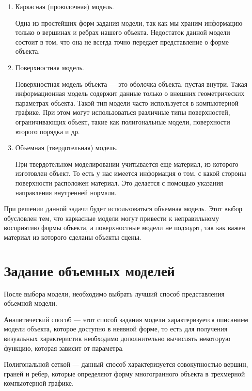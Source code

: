 \begin{enumerate}
	\item Каркасная (проволочная) модель.
	
	Одна из простейших форм задания модели, так как мы храним информацию только о вершинах и ребрах нашего объекта. Недостаток данной модели состоит в том, что она не всегда точно передает представление о форме объекта.
	
	\item Поверхностная модель.
	
	Поверхностная модель объекта --- это оболочка объекта, пустая внутри. Такая информационная модель содержит данные только о внешних геометрических параметрах объекта. Такой тип модели часто используется в компьютерной графике. При этом могут использоваться различные типы поверхностей, ограничивающих объект, такие как полигональные модели, поверхности второго порядка и др.
	
	\item  Объемная (твердотельная) модель.
	
	При твердотельном моделировании учитывается еще материал, из которого изготовлен объект. То есть у нас имеется информация о том, с какой стороны поверхности расположен материал. Это делается с помощью указания направления внутренней нормали.
	
\end{enumerate}

При решении данной задачи будет использоваться объемная модель. Этот выбор обусловлен тем, что каркасные модели могут привести к неправильному восприятию формы объекта, а поверхностные модели не подходят, так как важен материал из которого сделаны объекты сцены.

\section{Задание объемных моделей}

После выбора модели, необходимо выбрать лучший способ представления объемной модели.

Аналитический способ --- этот способ задания модели характеризуется описанием модели объекта, которое доступно в неявной форме, то есть для получения визуальных характеристик необходимо дополнительно вычислять некоторую функцию, которая зависит от параметра.

Полигональной сеткой --- данный способ характеризуется совокупностью вершин, граней и ребер, которые определяют форму многогранного объекта в трехмерной компьютерной графике.

